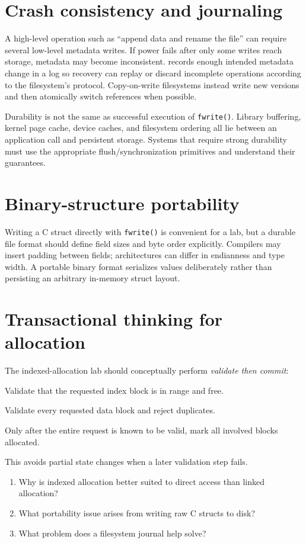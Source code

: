 \section{Crash consistency and journaling}
A high-level operation such as ``append data and rename the file'' can require several low-level metadata writes. If power fails after only some writes reach storage, metadata may become inconsistent.  records enough intended metadata change in a log so recovery can replay or discard incomplete operations according to the filesystem's protocol. Copy-on-write filesystems instead write new versions and then atomically switch references when possible.

\begin{keyidea}
Durability is not the same as successful execution of \texttt{fwrite()}. Library buffering, kernel page cache, device caches, and filesystem ordering all lie between an application call and persistent storage. Systems that require strong durability must use the appropriate flush/synchronization primitives and understand their guarantees.
\end{keyidea}

\section{Binary-structure portability}
Writing a C struct directly with \texttt{fwrite()} is convenient for a lab, but a durable file format should define field sizes and byte order explicitly. Compilers may insert padding between fields; architectures can differ in endianness and type width. A portable binary format serializes values deliberately rather than persisting an arbitrary in-memory struct layout.

\section{Transactional thinking for allocation}
The indexed-allocation lab should conceptually perform \emph{validate then commit}:
\begin{mlsteps}
  \item Validate that the requested index block is in range and free.
  \item Validate every requested data block and reject duplicates.
  \item Only after the entire request is known to be valid, mark all involved blocks allocated.
\end{mlsteps}
This avoids partial state changes when a later validation step fails.

\begin{quickcheck}
\begin{enumerate}
  \item Why is indexed allocation better suited to direct access than linked allocation?
  \item What portability issue arises from writing raw C structs to disk?
  \item What problem does a filesystem journal help solve?
\end{enumerate}
\end{quickcheck}
